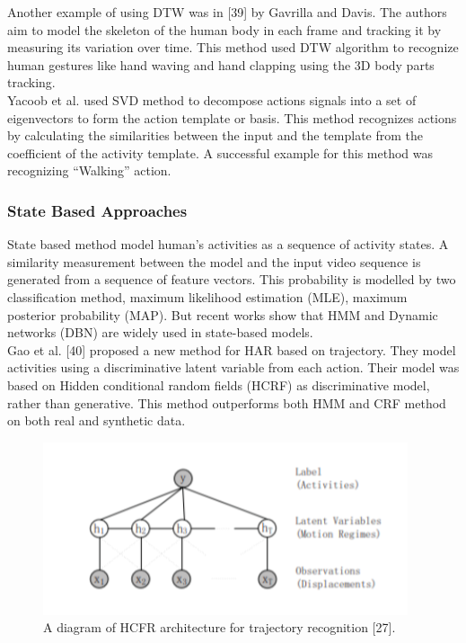 Another example of using DTW was in [39] by Gavrilla and Davis. The authors aim to model the skeleton of the human body in each frame and tracking it by measuring its variation over time. This method used DTW algorithm to recognize human gestures like hand waving and hand clapping using the 3D body parts tracking.\\

Yacoob et al. used SVD method to decompose actions signals into a set of eigenvectors to form the action template or basis. This method recognizes actions by calculating the similarities between the input and the template from the coefficient of the activity template. A successful example for this method was recognizing “Walking” action.

\subsubsection{State Based Approaches}
\hspace{5mm} State based method model human’s activities as a sequence of activity states. A similarity measurement between the model and the input video sequence is generated from a sequence of feature vectors. This probability is modelled by two classification method, maximum likelihood estimation (MLE), maximum posterior probability (MAP). But recent works show that HMM and Dynamic networks (DBN) are widely used in state-based models.\\

Gao et al. [40] proposed a new method for HAR based on trajectory. They model activities using a discriminative latent variable from each action. Their model was based on Hidden conditional random fields (HCRF) as discriminative model, rather than generative. This method outperforms both HMM and CRF method on both real and synthetic data.
\begin{figure}[ht]
\centering
\includegraphics{Figures/HCRF}
\decoRule
\caption[A diagram of HCFR architecture for trajectory recognition "27".]{A diagram of HCFR architecture for trajectory recognition [27].}
\label{fig:la}
\end{figure}\\


